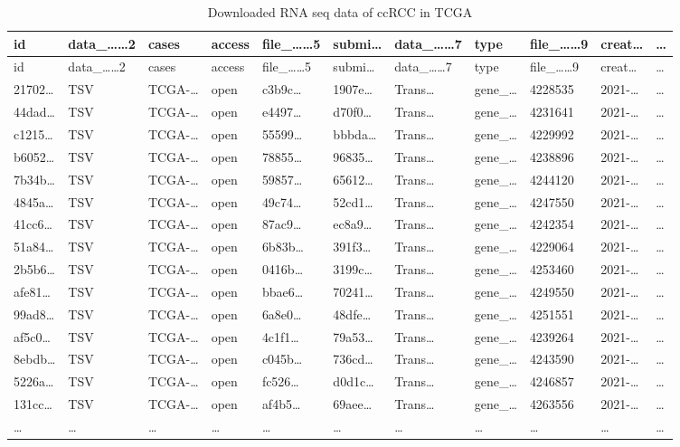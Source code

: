 \documentclass[
]{article}
\begin{document}
\begin{longtable}[]{@{}lllllllllll@{}}
\caption{\label{tab:downloaded-RNA-seq-data-of-ccRCC-in-TCGA}Downloaded RNA seq data of ccRCC in TCGA}\tabularnewline
\toprule
id & data\_\ldots\ldots2 & cases & access & file\_\ldots\ldots5 & submi\ldots{} & data\_\ldots\ldots7 & type & file\_\ldots\ldots9 & creat\ldots{} & \ldots{}\tabularnewline
\midrule
\endfirsthead
\toprule
id & data\_\ldots\ldots2 & cases & access & file\_\ldots\ldots5 & submi\ldots{} & data\_\ldots\ldots7 & type & file\_\ldots\ldots9 & creat\ldots{} & \ldots{}\tabularnewline
\midrule
\endhead
21702\ldots{} & TSV & TCGA-\ldots{} & open & c3b9c\ldots{} & 1907e\ldots{} & Trans\ldots{} & gene\_\ldots{} & 4228535 & 2021-\ldots{} & \ldots{}\tabularnewline
44dad\ldots{} & TSV & TCGA-\ldots{} & open & e4497\ldots{} & d70f0\ldots{} & Trans\ldots{} & gene\_\ldots{} & 4231641 & 2021-\ldots{} & \ldots{}\tabularnewline
c1215\ldots{} & TSV & TCGA-\ldots{} & open & 55599\ldots{} & bbbda\ldots{} & Trans\ldots{} & gene\_\ldots{} & 4229992 & 2021-\ldots{} & \ldots{}\tabularnewline
b6052\ldots{} & TSV & TCGA-\ldots{} & open & 78855\ldots{} & 96835\ldots{} & Trans\ldots{} & gene\_\ldots{} & 4238896 & 2021-\ldots{} & \ldots{}\tabularnewline
7b34b\ldots{} & TSV & TCGA-\ldots{} & open & 59857\ldots{} & 65612\ldots{} & Trans\ldots{} & gene\_\ldots{} & 4244120 & 2021-\ldots{} & \ldots{}\tabularnewline
4845a\ldots{} & TSV & TCGA-\ldots{} & open & 49c74\ldots{} & 52cd1\ldots{} & Trans\ldots{} & gene\_\ldots{} & 4247550 & 2021-\ldots{} & \ldots{}\tabularnewline
41cc6\ldots{} & TSV & TCGA-\ldots{} & open & 87ac9\ldots{} & ec8a9\ldots{} & Trans\ldots{} & gene\_\ldots{} & 4242354 & 2021-\ldots{} & \ldots{}\tabularnewline
51a84\ldots{} & TSV & TCGA-\ldots{} & open & 6b83b\ldots{} & 391f3\ldots{} & Trans\ldots{} & gene\_\ldots{} & 4229064 & 2021-\ldots{} & \ldots{}\tabularnewline
2b5b6\ldots{} & TSV & TCGA-\ldots{} & open & 0416b\ldots{} & 3199c\ldots{} & Trans\ldots{} & gene\_\ldots{} & 4253460 & 2021-\ldots{} & \ldots{}\tabularnewline
afe81\ldots{} & TSV & TCGA-\ldots{} & open & bbae6\ldots{} & 70241\ldots{} & Trans\ldots{} & gene\_\ldots{} & 4249550 & 2021-\ldots{} & \ldots{}\tabularnewline
99ad8\ldots{} & TSV & TCGA-\ldots{} & open & 6a8e0\ldots{} & 48dfe\ldots{} & Trans\ldots{} & gene\_\ldots{} & 4251551 & 2021-\ldots{} & \ldots{}\tabularnewline
af5c0\ldots{} & TSV & TCGA-\ldots{} & open & 4c1f1\ldots{} & 79a53\ldots{} & Trans\ldots{} & gene\_\ldots{} & 4239264 & 2021-\ldots{} & \ldots{}\tabularnewline
8ebdb\ldots{} & TSV & TCGA-\ldots{} & open & c045b\ldots{} & 736cd\ldots{} & Trans\ldots{} & gene\_\ldots{} & 4243590 & 2021-\ldots{} & \ldots{}\tabularnewline
5226a\ldots{} & TSV & TCGA-\ldots{} & open & fc526\ldots{} & d0d1c\ldots{} & Trans\ldots{} & gene\_\ldots{} & 4246857 & 2021-\ldots{} & \ldots{}\tabularnewline
131cc\ldots{} & TSV & TCGA-\ldots{} & open & af4b5\ldots{} & 69aee\ldots{} & Trans\ldots{} & gene\_\ldots{} & 4263556 & 2021-\ldots{} & \ldots{}\tabularnewline
\ldots{} & \ldots{} & \ldots{} & \ldots{} & \ldots{} & \ldots{} & \ldots{} & \ldots{} & \ldots{} & \ldots{} & \ldots{}\tabularnewline
\bottomrule
\end{longtable}
\end{document}
